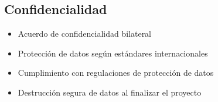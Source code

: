\subsection{Confidencialidad}
\begin{itemize}
    \item Acuerdo de confidencialidad bilateral
    \item Protección de datos según estándares internacionales
    \item Cumplimiento con regulaciones de protección de datos
    \item Destrucción segura de datos al finalizar el proyecto
\end{itemize}
